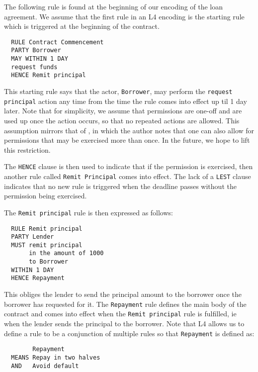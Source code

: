 \documentclass{article}
\begin{document}
The following rule is found at the beginning of our encoding of the loan
agreement.
We assume that the first rule in an L4 encoding is the starting rule which is
triggered at the beginning of the contract.

\begin{lstlisting}
  RULE Contract Commencement
  PARTY Borrower
  MAY WITHIN 1 DAY
  request funds
  HENCE Remit principal
\end{lstlisting}

This starting rule says that the actor, \texttt{Borrower},
may perform the \texttt{request principal} action any time from the time the
rule comes into effect up til 1 day later.
Note that for simplicity, we assume that permissions are one-off and are
used up once the action occurs, so that no repeated actions are allowed.
This assumption mirrors that of \cite{real_time_contract_automata}, in which
the author notes that one can also allow for permissions that may be exercised
more than once.
In the future, we hope to lift this restriction.

The \texttt{HENCE} clause is then used to indicate that if the permission is
exercised, then another rule called \texttt{Remit Principal} comes into effect.
The lack of a \texttt{LEST} clause indicates that no new rule is triggered
when the deadline passes without the permission being exercised.

The \texttt{Remit principal} rule is then expressed as follows:

\begin{lstlisting}
  RULE Remit principal		
  PARTY	Lender		
  MUST remit principal
       in the amount of 1000
       to Borrower
  WITHIN 1 DAY
  HENCE	Repayment
\end{lstlisting}

This obliges the lender to send the principal amount to the borrower once
the borrower has requested for it.
The \texttt{Repayment} rule defines the main body of the contract and comes
into effect when the \texttt{Remit principal} rule is fulfilled, ie when the
lender sends the principal to the borrower.
Note that L4 allows us to define a rule to be a conjunction of multiple rules
so that \texttt{Repayment} is defined as:

\begin{lstlisting}
        Repayment
  MEANS Repay in two halves
  AND   Avoid default
\end{lstlisting}
\end{document}
